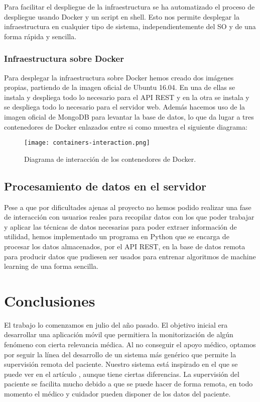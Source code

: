 \documentclass[11pt,spanish]{article}
\begin{document}
Para facilitar el despliegue de la infraestructura se ha automatizado el proceso de despliegue usando Docker y un script en shell. Esto nos permite desplegar la infraestructura en cualquier tipo de sistema, independientemente del SO y de una forma rápida y sencilla.

\subsubsection{Infraestructura sobre Docker}
Para desplegar la infraestructura sobre Docker hemos creado dos imágenes propias, partiendo de la imagen oficial de Ubuntu 16.04. En una de ellas se instala y despliega todo lo necesario para el API REST y en la otra se instala y se despliega todo lo necesario para el servidor web. Además hacemos uso de la imagen oficial de MongoDB para levantar la base de datos, lo que da lugar a tres contenedores de Docker enlazados entre si como muestra el siguiente diagrama:

\begin{figure}[H]
  \centering
  \texttt{[image: containers-interaction.png]}
  \caption{Diagrama de interacción de los contenedores de Docker.}
\end{figure}

\subsection{Procesamiento de datos en el servidor}

Pese a que por dificultades ajenas al proyecto no hemos podido realizar una fase de interacción con usuarios reales para recopilar datos con los que poder trabajar y aplicar las técnicas de datos necesarias para poder extraer información de utilidad, hemos implementado un programa en Python que se encarga de procesar los datos almacenados, por el API REST, en la base de datos remota para producir datos que pudiesen ser usados para entrenar algoritmos de machine learning de una forma sencilla.
\newpage

\section{Conclusiones}
El trabajo lo comenzamos en julio del año pasado. El objetivo inicial era desarrollar una aplicación móvil que permitiera la monitorización de algún fenómeno con cierta relevancia médica. Al no conseguir el apoyo médico, optamos por seguir la línea del desarrollo de un sistema más genérico que permite la supervisión remota del paciente. Nuestro sistema está inspirado en el que se puede ver en el artículo \cite{resumen1}, aunque tiene ciertas diferencias. La supervisión del paciente se facilita mucho debido a que se puede hacer de forma remota, en todo momento el médico y cuidador pueden disponer de los datos del paciente.
\newline
\end{document}

